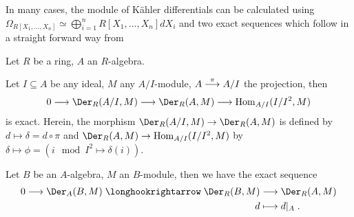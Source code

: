 \documentclass[a4paper,parskip=half,numbers=enddot, DIV=12]{scrreprt}
\begin{document}
In many cases, the module of Kähler differentials can be calculated using $\Omega_{R[X_1,\ldots,X_n]}\simeq \bigoplus_{i=1}^n R[X_1,\ldots, X_n] dX_i$ and two exact sequences which follow in a straight forward way from
\begin{fact}
    Let $R$ be a ring, $A$ an $R$-algebra.
    \begin{alphanumerate}
        \item 
            Let $I\subseteq A$ be any ideal, $M$ any $A/I$-module, $A\morphism[\pi]A/I$ the projection, then 
            \begin{align}\lbl{eq:derExactSequence1}
                0\morphism \Der_R(A/I,M) \morphism \Der_R(A,M) \morphism \Hom_{A/I}(I/I^2, M) 
            \end{align}
            is exact. Herein, the morphism $\Der_R(A/I,M) \morphism \Der_R(A,M)$ is defined by $d\mapsto \delta=d\circ\pi$ and $\Der_R(A,M) \morphism \Hom_{A/I}(I/I^2, M)$ by $\delta\mapsto\phi = \left(i\mod I^2\mapsto\delta(i)\right)$.
        \item 
            Let $B$ be an $A$-algebra, $M$ an $B$-module, then we have the exact sequence
            \begin{align}\lbl{eq:derExactSequence2}
	            \begin{split}
		            0 \morphism \Der_A(B,M) \monomorphism\Der_R(B,M) &\morphism \Der_R(A,M)\\
		            d&\longmapsto d|_A\;.
	            \end{split}
            \end{align}
    \end{alphanumerate}
\end{fact}
\end{document}
